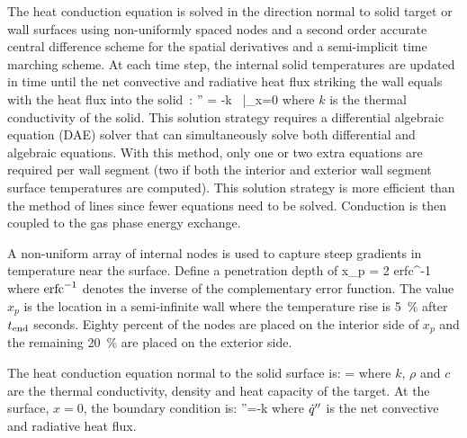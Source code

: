The heat conduction equation is solved in the direction normal to solid target or wall surfaces using non-uniformly spaced nodes and a second order accurate central difference scheme for the spatial derivatives and a semi-implicit time marching scheme. At each time step, the internal solid temperatures are updated in time until the net convective and radiative heat flux striking the wall equals with the heat flux into the solid~\cite{Moss:1992}:
\be
   \dq'' = -k \,  \Big|_{x=0}
\ee
where $k$ is the thermal conductivity of the solid.  This solution strategy requires a differential algebraic equation (DAE) solver that can simultaneously solve both differential and algebraic equations.  With this method, only one or two extra equations are required per wall segment (two if both the interior and exterior wall segment surface temperatures are computed).  This solution strategy is more efficient than the method of lines since fewer equations need to be solved. Conduction is then coupled to the gas phase energy exchange.

A non-uniform array of internal nodes is used to capture steep gradients in temperature near the surface. Define a penetration depth of
\be
   x_p = 2  \; \hbox{erfc}^{-1} 
\ee
where $\hbox{erfc}^{-1}$ denotes the inverse of the complementary error function. The value $x_p$ is the location in a semi-infinite wall where the temperature rise is 5~\% after $t_{\rm end}$ seconds. Eighty percent of the nodes are placed on the interior side of $x_p$ and the remaining 20~\% are placed on the exterior side.

The heat conduction equation normal to the solid surface is:
\be {} = 
\label{eq:Target_PDE} \ee
where $k$, $\rho$ and $c$ are the thermal conductivity, density and heat capacity of the target. At the surface, $x=0$, the boundary condition is:
\be 
   \dq''=-k \label{eq:Target_Fourier}
\ee
where $\dot{q}''$ is the net convective and radiative heat flux. 

\newcommand{\Dt}{\Delta t}
\newcommand{\Dr}{\Delta r}
\newcommand{\Tipo}{T_{i+1}^{n+1}}
\newcommand{\Ti}{T_{i}^{n+1}}
\newcommand{\Timo}{T_{i-1}^{n+1}}

